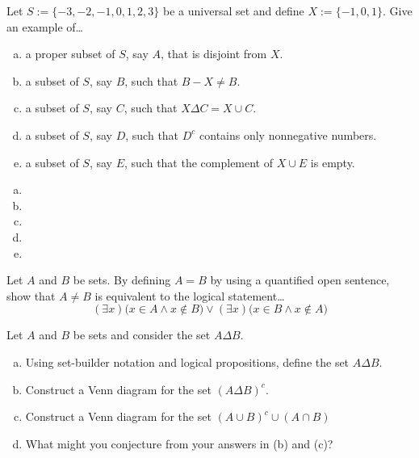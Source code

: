 \documentclass[11pt,letterpaper]{article}
\begin{document}

 Let $S:= \{ -3, -2, -1, 0, 1, 2, 3 \}$ be a universal set and define $X:= \{ -1, 0, 1 \}$. Give an example of\dots
	\begin{enumerate}[(a)]
	\item a proper subset of $S$, say $A$, that is disjoint from $X$.
	\item a subset of $S$, say $B$, such that $B - X \neq B$.
	\item a subset of $S$, say $C$, such that $X \Delta C= X \cup C$.
	\item a subset of $S$, say $D$, such that $D^c$ contains only nonnegative numbers.
	\item a subset of $S$, say $E$, such that the complement of $X \cup E$ is empty. 
	\end{enumerate} \pspace

\sol
\begin{enumerate}[(a)]
\item 
\item 
\item 
\item 
\item 
\end{enumerate}



\newpage



 Let $A$ and $B$ be sets. By defining $A= B$ by using a quantified open sentence, show that $A \neq B$ is equivalent to the logical statement\dots
	\[
	(\exists x) \big( x \in A \wedge x \notin B \big) \vee (\exists x) \big( x \in B \wedge x \notin A \big)
	\]

\sol 



\newpage



 Let $A$ and $B$ be sets and consider the set $A \Delta B$. 
	\begin{enumerate}[(a)]
	\item Using set-builder notation and logical propositions, define the set $A \Delta B$.
	\item Construct a Venn diagram for the set $(A \Delta B)^c$.
	\item Construct a Venn diagram for the set $(A \cup B)^c \cup (A \cap B)$
	\item What might you conjecture from your answers in (b) and (c)?
	\end{enumerate} \pspace
\end{document}
